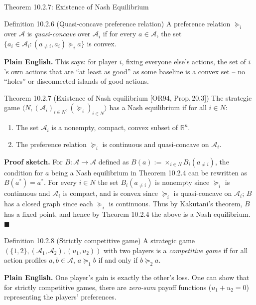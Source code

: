 \documentclass[aspectratio=169,10pt]{beamer}
\newcommand{\R}{\mathbb{R}}
\newcommand{\Ac}{\mathcal{A}}
\begin{document}
\begin{frame}[allowframebreaks]{Theorem 10.2.7: Existence of Nash Equilibrium}
  \begin{block}{Definition 10.2.6 (Quasi-concave preference relation)}
    A preference relation $\succeq_i$ over $\Ac$ is \emph{quasi-concave}
    over $\Ac_i$ if for every $a\in\Ac$, the set
    $\{a_i\in\Ac_i : (a_{\neq i},a_i)\succeq_i a\}$ is convex.
  \end{block}
  \textbf{Plain English.} This says: for player $i$, fixing everyone
  else's actions, the set of $i$'s own actions that are ``at least as
  good'' as some baseline is a convex set -- no ``holes'' or
  disconnected islands of good actions.

  \begin{block}{Theorem 10.2.7 (Existence of Nash equilibrium {\footnotesize[OR94, Prop.\,20.3]})}
    The strategic game $\langle N,(\Ac_i)_{i\in N},(\succeq_i)_{i\in
    N}\rangle$ has a Nash equilibrium if for all $i\in N$:
    \begin{enumerate}
      \item The set $\Ac_i$ is a nonempty, compact, convex subset of
        $\R^n$.
      \item The preference relation $\succeq_i$ is continuous and
        quasi-concave on $\Ac_i$.
    \end{enumerate}
  \end{block}

  \framebreak
  \textbf{Proof sketch.} For $B:\Ac\to\Ac$ defined as
  $B(a):=\times_{i\in N}B_i(a_{\neq i})$, the condition for $a$ being a
  Nash equilibrium in Theorem 10.2.4 can be rewritten as $B(a^*)=a^*$. For
  every $i\in N$ the set $B_i(a_{\neq i})$ is nonempty since $\succeq_i$ is
  continuous and $\Ac_i$ is compact, and is convex since $\succeq_i$ is
  quasi-concave on $\Ac_i$; $B$ has a closed graph since each $\succeq_i$
  is continuous. Thus by Kakutani's theorem, $B$ has a fixed point, and
  hence by Theorem 10.2.4 the above is a Nash equilibrium. $\blacksquare$

  \vspace{0.4em}
  \begin{block}{Definition 10.2.8 (Strictly competitive game)}
    A strategic game $(\{1,2\},(\Ac_1,\Ac_2),(u_1,u_2))$ with two players
    is a \emph{competitive game} if for all action profiles $a,b\in\Ac$,
    $a\succeq_1 b$ if and only if $b\succeq_2 a$.
  \end{block}
  \textbf{Plain English.} One player's gain is exactly the other's loss.
  One can show that for strictly competitive games, there are
  \emph{zero-sum} payoff functions ($u_1+u_2=0$) representing the
  players' preferences.
\end{frame}
\end{document}
